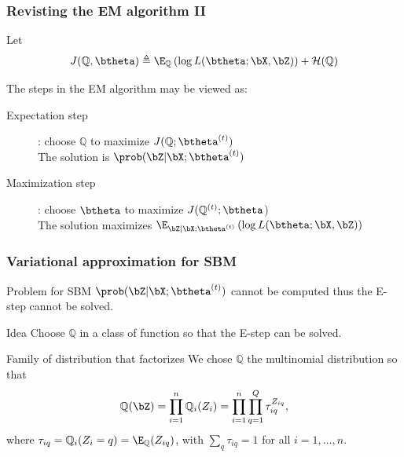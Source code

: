 \documentclass{beamer}\usepackage[]{graphicx}\usepackage[]{color}
\begin{document}
\begin{frame}
  \frametitle{Revisting the EM algorithm II}
  Let
   \begin{equation*}
    J(\mathbb{Q},\btheta) \triangleq \E_{\mathbb{Q}}\left(\log L(\btheta ;\bX,\bZ)\right) + \mathcal{H}(\mathbb{Q})
\end{equation*}

  \vfill

  The steps in the EM algorithm may be viewed as:
  \begin{description}
    \item[Expectation step]: choose $\mathbb{Q}$ to maximize $J(\mathbb{Q};\btheta^{(t)})$\\[2ex]
      \alert{The solution is $\prob(\bZ|\bX;\btheta^{(t)})$}\\
    \item[Maximization step]: choose $\btheta$ to maximize $J(\mathbb{Q}^{(t)};\btheta$)\\[2ex]
      \alert{The solution maximizes $\E_{\bZ|\bX;\btheta^{(t)}}\left(\log L(\btheta ;\bX,\bZ)\right)$}
  \end{description}

\end{frame}

\begin{frame}
  \frametitle{Variational approximation for SBM}

    \begin{block}{Problem for SBM}
      $\prob(\bZ|\bX;\btheta^{(t)})$ cannot be computed thus the E-step cannot be solved.
  \end{block}

  \begin{block}{Idea}
      Choose $\mathbb{Q}$ in a class of function so that the E-step can be solved.
  \end{block}

  \begin{block}{Family of distribution that factorizes}
      We chose $\mathbb{Q}$ the multinomial distribution so that
      \begin{equation*}
        \mathbb{Q}(\bZ) = \prod_{i=1}^n \mathbb{Q}_i(Z_i) = \prod_{i=1}^n\prod_{q=1}^Q \tau_{iq}^{Z_{iq}},
      \end{equation*}
      where $\tau_{iq} =\mathbb{Q}_i(Z_{i} = q) = \E_{\mathbb{Q}}(Z_{iq})$, with $\sum_{q} \tau_{iq} = 1$ for all $i=1,\dots,n$.
  \end{block}

\end{frame}
\end{document}
